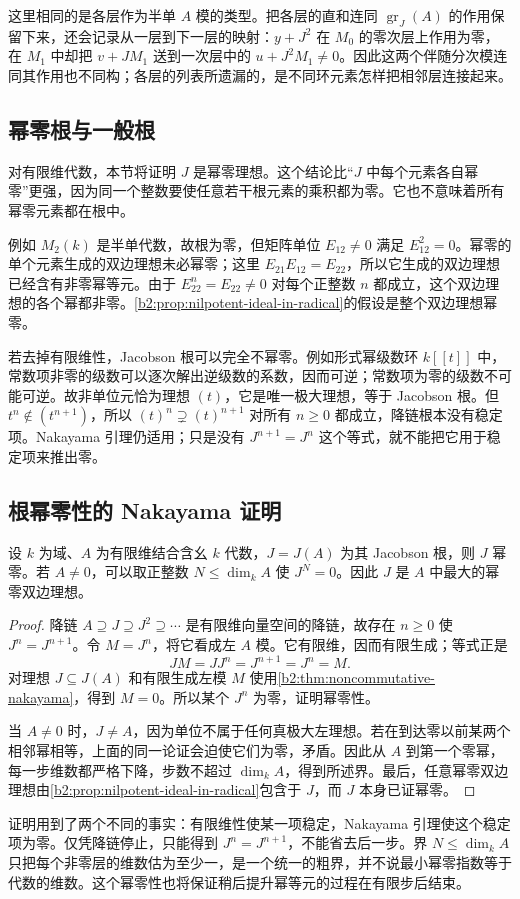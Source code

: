 \ProseParagraphBreak
这里相同的是各层作为半单 \(A\) 模的类型。把各层的直和连同 \(\operatorname{gr}_J(A)\) 的作用保留下来，还会记录从一层到下一层的映射：\(y+J^2\) 在 \(M_0\) 的零次层上作用为零，在 \(M_1\) 中却把 \(v+JM_1\) 送到一次层中的 \(u+J^2M_1\ne0\)。因此这两个伴随分次模连同其作用也不同构；各层的列表所遗漏的，是不同环元素怎样把相邻层连接起来。

\subsection{幂零根与一般根}
\label{b2:subsec:1501:03}

对有限维代数，本节将证明 \(J\) 是幂零理想。这个结论比“\(J\) 中每个元素各自幂零”更强，因为同一个整数要使任意若干根元素的乘积都为零。它也不意味着所有幂零元素都在根中。

\ProseParagraphBreak
例如 \(M_2(k)\) 是半单代数，故根为零，但矩阵单位 \(E_{12}\ne0\) 满足 \(E_{12}^2=0\)。幂零的单个元素生成的双边理想未必幂零；这里 \(E_{21}E_{12}=E_{22}\)，所以它生成的双边理想已经含有非零幂等元。由于 \(E_{22}^n=E_{22}\ne0\) 对每个正整数 \(n\) 都成立，这个双边理想的各个幂都非零。\cref{b2:prop:nilpotent-ideal-in-radical}的假设是整个双边理想幂零。

\ProseParagraphBreak
若去掉有限维性，Jacobson 根可以完全不幂零。例如形式幂级数环 \(k[\![t]\!]\) 中，常数项非零的级数可以逐次解出逆级数的系数，因而可逆；常数项为零的级数不可能可逆。故非单位元恰为理想 \((t)\)，它是唯一极大理想，等于 Jacobson 根。但 \(t^n\notin(t^{n+1})\)，所以 \((t)^n\supsetneq(t)^{n+1}\) 对所有 \(n\ge0\) 都成立，降链根本没有稳定项。Nakayama 引理仍适用；只是没有 \(J^{n+1}=J^n\) 这个等式，就不能把它用于稳定项来推出零。

\subsection{根幂零性的 Nakayama 证明}
\label{b2:subsec:1501:04}

\begin{theorem}\label{b2:thm:finite-algebra-radical-nilpotent}
	设 \(k\) 为域、\(A\) 为有限维结合含幺 \(k\) 代数，\(J=J(A)\) 为其 Jacobson 根，则 \(J\) 幂零。若 \(A\ne0\)，可以取正整数 \(N\le\dim_k A\) 使 \(J^N=0\)。因此 \(J\) 是 \(A\) 中最大的幂零双边理想。
\end{theorem}
\begin{proof}
	降链 \(A\supseteq J\supseteq J^2\supseteq\cdots\) 是有限维向量空间的降链，故存在 \(n\ge0\) 使 \(J^n=J^{n+1}\)。令 \(M=J^n\)，将它看成左 \(A\) 模。它有限维，因而有限生成；等式正是
	\[
		JM=J J^n=J^{n+1}=J^n=M.
	\]
	对理想 \(J\subseteq J(A)\) 和有限生成左模 \(M\) 使用\cref{b2:thm:noncommutative-nakayama}，得到 \(M=0\)。所以某个 \(J^n\) 为零，证明幂零性。

	当 \(A\ne0\) 时，\(J\ne A\)，因为单位不属于任何真极大左理想。若在到达零以前某两个相邻幂相等，上面的同一论证会迫使它们为零，矛盾。因此从 \(A\) 到第一个零幂，每一步维数都严格下降，步数不超过 \(\dim_k A\)，得到所述界。最后，任意幂零双边理想由\cref{b2:prop:nilpotent-ideal-in-radical}包含于 \(J\)，而 \(J\) 本身已证幂零。
\end{proof}

证明用到了两个不同的事实：有限维性使某一项稳定，Nakayama 引理使这个稳定项为零。仅凭降链停止，只能得到 \(J^n=J^{n+1}\)，不能省去后一步。界 \(N\le\dim_k A\) 只把每个非零层的维数估为至少一，是一个统一的粗界，并不说最小幂零指数等于代数的维数。这个幂零性也将保证稍后提升幂等元的过程在有限步后结束。
